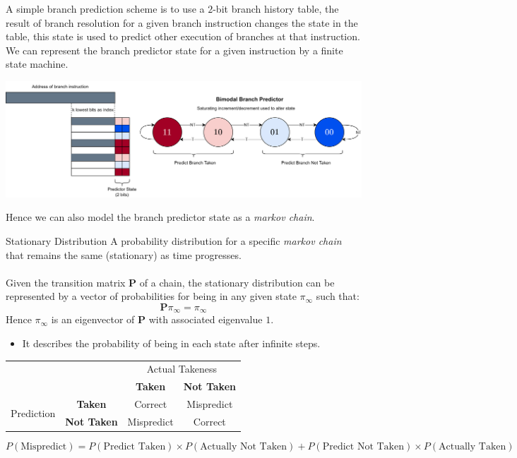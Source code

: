 A simple branch prediction scheme is to use a $2$-bit branch history table, the result of branch resolution for a given branch instruction changes the state in the table, this state is used to predict other execution of branches at that instruction.
We can represent the branch predictor state for a given instruction by a finite state machine.
\begin{center}
    \includegraphics[width=.9\textwidth]{modelling/images/bimodal.drawio.png}
\end{center}
Hence we can also model the branch predictor state as a \textit{markov chain}.
\begin{definitionbox}{Stationary Distribution}
    A probability distribution for a specific \textit{markov chain} that remains the same (stationary) as time progresses.
    \\
    \\ Given the transition matrix $\mathbf{P}$ of a chain, the stationary distribution can be represented by a vector of probabilities for being in any given state $\pi_\infty$ such that:
    \[\mathbf{P} \pi_\infty = \pi_\infty\]
    Hence $\pi_\infty$ is an eigenvector of $\mathbf{P}$ with associated eigenvalue $1$.
    \begin{itemize}
        \item It describes the probability of being in each state after infinite steps. 
    \end{itemize}
\end{definitionbox}
\begin{center}
    \begin{tabular}{r c | c c}
        & & \multicolumn{2}{c}{Actual Takeness} \\
        & & \textbf{Taken} & \textbf{Not Taken} \\
        \hline
        \multirow{2}{*}{Prediction} & \textbf{Taken} & Correct & Mispredict\\
        & \textbf{Not Taken} & Mispredict & Correct \\
    \end{tabular}
\end{center}
\[P(\text{Mispredict}) = P(\text{Predict Taken}) \times P(\text{Actually Not Taken}) + P(\text{Predict Not Taken}) \times P(\text{Actually Taken}) \]



